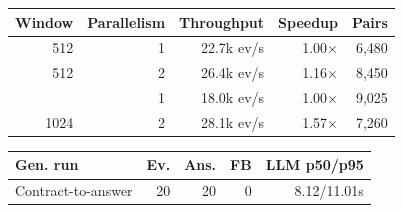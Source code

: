 \begingroup
\scriptsize
\setlength{\tabcolsep}{2.6pt}
\begin{minipage}{\columnwidth}
\centering
\begin{tabular}{@{}rrrrr@{}}
  \toprule
  Window & Parallelism & Throughput & Speedup & Pairs \\
  \midrule
  512 & 1 & 22.7k ev/s & 1.00$\times$ & 6,480 \\
  512 & 2 & 26.4k ev/s & 1.16$\times$ & 8,450 \\
  \addlinespace[2pt]
  1024 & 1 & 18.0k ev/s & 1.00$\times$ & 9,025 \\
  1024 & 2 & 28.1k ev/s & 1.57$\times$ & 7,260 \\
  \bottomrule
\end{tabular}

\vspace{3pt}
\begin{tabular}{@{}lrrrr@{}}
  \toprule
  Gen. run & Ev. & Ans. & FB & LLM p50/p95 \\
  \midrule
  Contract-to-answer & 20 & 20 & 0 & 8.12/11.01s \\
  \bottomrule
\end{tabular}
\end{minipage}
\endgroup

